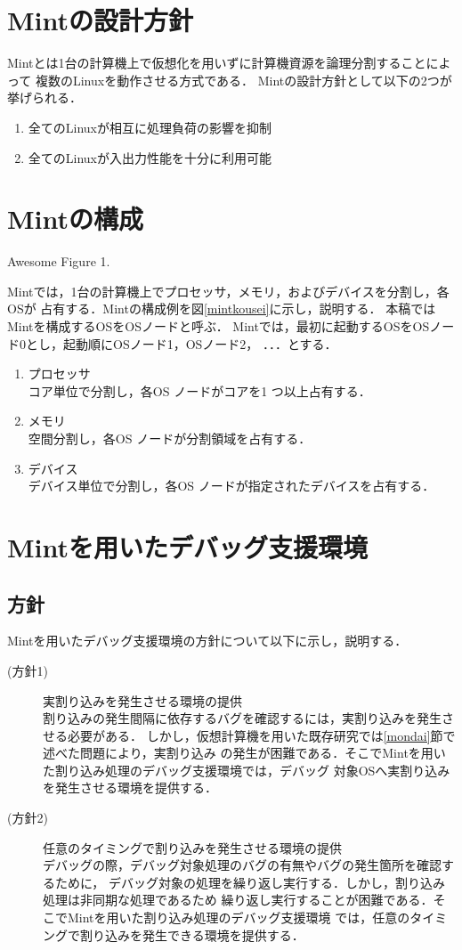 \documentclass[tanilab-enum]{graduate}
\begin{document}
\section{Mintの設計方針}
Mintとは1台の計算機上で仮想化を用いずに計算機資源を論理分割することによって
複数のLinuxを動作させる方式である．
Mintの設計方針として以下の2つが挙げられる．
\begin{enumerate}
    \item 全てのLinuxが相互に処理負荷の影響を抑制
    \item 全てのLinuxが入出力性能を十分に利用可能
\end{enumerate}
\section{Mintの構成}
{Awesome Figure 1.}

Mintでは，1台の計算機上でプロセッサ，メモリ，およびデバイスを分割し，各OSが
占有する．Mintの構成例を図\ref{mintkousei}に示し，説明する．
本稿ではMintを構成するOSをOSノードと呼ぶ．
Mintでは，最初に起動するOSをOSノード0とし，起動順にOSノード1，OSノード2，
．．．とする．
\begin{enumerate}
    \item プロセッサ\\
        コア単位で分割し，各OS ノードがコアを1 つ以上占有する．
    \item メモリ\\
        空間分割し，各OS ノードが分割領域を占有する．
    \item デバイス\\
        デバイス単位で分割し，各OS ノードが指定されたデバイスを占有する．
\end{enumerate}
\section{Mintを用いたデバッグ支援環境}
\subsection{方針}
Mintを用いたデバッグ支援環境の方針について以下に示し，説明する．
\begin{description}
    \item[(方針1)]実割り込みを発生させる環境の提供\\
        割り込みの発生間隔に依存するバグを確認するには，実割り込みを発生させる必要がある．
        しかし，仮想計算機を用いた既存研究では\ref{mondai}節で述べた問題により，実割り込み
        の発生が困難である．そこでMintを用いた割り込み処理のデバッグ支援環境では，デバッグ
        対象OSへ実割り込みを発生させる環境を提供する．
    \item[(方針2)]任意のタイミングで割り込みを発生させる環境の提供\\
        デバッグの際，デバッグ対象処理のバグの有無やバグの発生箇所を確認するために，
        デバッグ対象の処理を繰り返し実行する．しかし，割り込み処理は非同期な処理であるため
        繰り返し実行することが困難である．そこでMintを用いた割り込み処理のデバッグ支援環境
        では，任意のタイミングで割り込みを発生できる環境を提供する．
\end{description}
\end{document}
